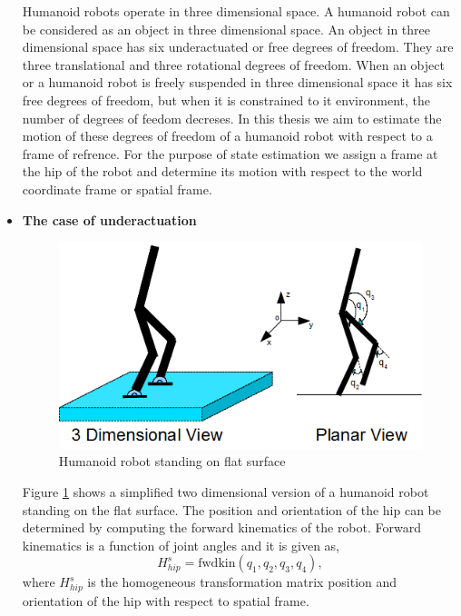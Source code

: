 \begin{itemize}
    Humanoid robots operate in three dimensional space. A humanoid robot can be considered as an object in three dimensional space. An object in three dimensional space has six underactuated or free degrees of freedom. They are three translational and three rotational degrees of freedom. When an object or a humanoid robot is freely suspended in three dimensional space it has six free degrees of freedom, but when it is constrained to it environment, the number of degrees of feedom decreses. In this thesis we aim to estimate the motion of these degrees of freedom of a humanoid robot with respect to a frame of refrence. For the purpose of state estimation we assign a frame at the hip of the robot and determine its motion with respect to the world coordinate frame or spatial frame.
    
    \item \textbf{The case of underactuation}
     \begin{figure}[h]
	    \centering
    	\includegraphics[scale=0.75]{Bilder/robot_flatfloor}
	    \caption{Humanoid robot standing on flat surface}	
	    \label{fig:flat_floor}
    \end{figure}
   Figure \ref{fig:flat_floor} shows a simplified two dimensional version of a humanoid robot standing on the flat surface. The position and orientation of the hip can be determined by computing the forward kinematics of the robot. Forward kinematics is a function of joint angles and it is given as,
    \begin{equation}
    \label{eq:fwkin_flat}
    H_{hip}^s = \text{fwdkin}(q_1,q_2,q_3,q_4),
    \end{equation}
    where $H_{hip}^s$ is the homogeneous transformation matrix position and orientation of the hip with respect to spatial frame. 
    \begin{figure}[h]

\end{figure}
\end{itemize}
